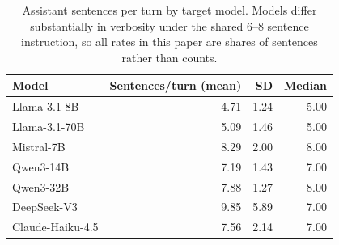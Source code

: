 \begin{table}[t]
\centering
\small
\caption{Assistant sentences per turn by target model. Models differ substantially in verbosity under the shared 6--8 sentence instruction, so all rates in this paper are shares of sentences rather than counts.}
\label{tab:spt}
\begin{tabular}{lrrr}
\toprule
Model & Sentences/turn (mean) & SD & Median \\
\midrule
Llama-3.1-8B & 4.71 & 1.24 & 5.00 \\
Llama-3.1-70B & 5.09 & 1.46 & 5.00 \\
Mistral-7B & 8.29 & 2.00 & 8.00 \\
Qwen3-14B & 7.19 & 1.43 & 7.00 \\
Qwen3-32B & 7.88 & 1.27 & 8.00 \\
DeepSeek-V3 & 9.85 & 5.89 & 7.00 \\
Claude-Haiku-4.5 & 7.56 & 2.14 & 7.00 \\
\bottomrule
\end{tabular}
\end{table}
